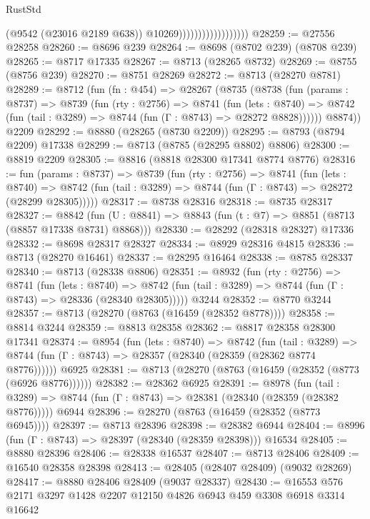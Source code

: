 \begin{lexlean}{RustStd}
\begin{coremodule}
                                        (@9542 (@23016 @2189 @638))
                                        @10269))))))))))))))))))
@28259 := @27556 @28258
@28260 := @8696 @239
@28264 := @8698 (@8702 @239) (@8708 @239)
@28265 := @8717 @17335
@28267 := @8713 (@28265 @8732)
@28269 := @8755 (@8756 @239)
@28270 := @8751 @28269
@28272 := @8713 (@28270 @8781)
@28289 := @8712
    (fun (fn : @454) =>
    @28267
      (@8735
        (@8738
          (fun (params : @8737) =>
          @8739
            (fun (rty : @2756) =>
            @8741
              (fun (lets : @8740) =>
              @8742 (fun (tail : @3289) => @8744 (fun (Γ : @8743) => @28272 @8828))))))
        @8874))
    @2209
@28292 := @8880 (@28265 (@8730 @2209))
@28295 := @8793 (@8794 @2209) @17338
@28299 := @8713 (@8785 (@28295 @8802) @8806)
@28300 := @8819 @2209
@28305 := @8816 (@8818 @28300 @17341 @8774 @8776)
@28316 := fun (params : @8737) =>
  @8739
    (fun (rty : @2756) =>
    @8741
      (fun (lets : @8740) =>
      @8742 (fun (tail : @3289) => @8744 (fun (Γ : @8743) => @28272 (@28299 @28305)))))
@28317 := @8738 @28316
@28318 := @8735 @28317
@28327 := @8842
    (fun (U : @8841) => @8843 (fun (t : @7) => @8851 (@8713 (@8857 @17338 @8731) @8868)))
@28330 := @28292 (@28318 @28327) @17336
@28332 := @8698 @28317 @28327
@28334 := @8929 @28316 @4815
@28336 := @8713 (@28270 @16461)
@28337 := @28295 @16464
@28338 := @8785 @28337
@28340 := @8713 (@28338 @8806)
@28351 := @8932
    (fun (rty : @2756) =>
    @8741
      (fun (lets : @8740) =>
      @8742 (fun (tail : @3289) => @8744 (fun (Γ : @8743) => @28336 (@28340 @28305)))))
    @3244
@28352 := @8770 @3244
@28357 := @8713 (@28270 (@8763 (@16459 (@28352 @8778))))
@28358 := @8814 @3244
@28359 := @8813 @28358
@28362 := @8817 @28358 @28300 @17341
@28374 := @8954
    (fun (lets : @8740) =>
    @8742
      (fun (tail : @3289) =>
      @8744 (fun (Γ : @8743) => @28357 (@28340 (@28359 (@28362 @8774 @8776))))))
    @6925
@28381 := @8713 (@28270 (@8763 (@16459 (@28352 (@8773 (@6926 @8776))))))
@28382 := @28362 @6925
@28391 := @8978
    (fun (tail : @3289) => @8744 (fun (Γ : @8743) => @28381 (@28340 (@28359 (@28382 @8776)))))
    @6944
@28396 := @28270 (@8763 (@16459 (@28352 (@8773 @6945))))
@28397 := @8713 @28396
@28398 := @28382 @6944
@28404 := @8996 (fun (Γ : @8743) => @28397 (@28340 (@28359 @28398))) @16534
@28405 := @8880 @28396
@28406 := @28338 @16537
@28407 := @8713 @28406
@28409 := @16540 @28358 @28398
@28413 := @28405 (@28407 @28409) (@9032 @28269)
@28417 := @8880 @28406 @28409 (@9037 @28337)
@28430 := @16553 @576 @2171 @3297 @1428 @2207 @12150 @4826 @6943 @459 @3308 @6918 @3314 @16642

\end{coremodule}
\end{lexlean}
